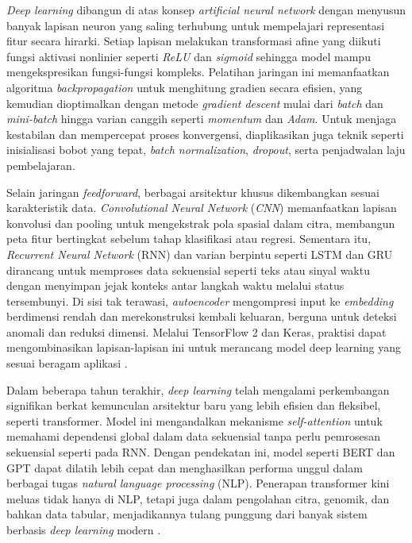 \emph{Deep learning} dibangun di atas konsep \emph{artificial neural network} dengan menyusun banyak lapisan neuron yang saling terhubung untuk mempelajari representasi fitur secara hirarki. Setiap lapisan melakukan transformasi afine yang diikuti fungsi aktivasi nonlinier seperti \emph{ReLU} dan \emph{sigmoid} sehingga model mampu mengekspresikan fungsi-fungsi kompleks. Pelatihan jaringan ini memanfaatkan algoritma \emph{backpropagation} untuk menghitung gradien secara efisien, yang kemudian dioptimalkan dengan metode \emph{gradient descent} mulai dari \emph{batch} dan \emph{mini-batch} hingga varian canggih seperti \emph{momentum} dan \emph{Adam}. Untuk menjaga kestabilan dan mempercepat proses konvergensi, diaplikasikan juga teknik seperti inisialisasi bobot yang tepat, \emph{batch normalization}, \emph{dropout}, serta penjadwalan laju pembelajaran.

Selain jaringan \emph{feedforward}, berbagai arsitektur khusus dikembangkan sesuai karakteristik data. \emph{Convolutional Neural Network} (\emph{CNN}) memanfaatkan lapisan konvolusi dan pooling untuk mengekstrak pola spasial dalam citra, membangun peta fitur bertingkat sebelum tahap klasifikasi atau regresi. Sementara itu, \emph{Recurrent Neural Network} (RNN) dan varian berpintu seperti LSTM dan GRU dirancang untuk memproses data sekuensial seperti teks atau sinyal waktu dengan menyimpan jejak konteks antar langkah waktu melalui status tersembunyi. Di sisi tak terawasi, \emph{autoencoder} mengompresi input ke \emph{embedding} berdimensi rendah dan merekonstruksi kembali keluaran, berguna untuk deteksi anomali dan reduksi dimensi. Melalui TensorFlow 2 dan Keras, praktisi dapat mengombinasikan lapisan-lapisan ini untuk merancang model deep learning yang sesuai beragam aplikasi \cite{Geron2019}.

Dalam beberapa tahun terakhir, \textit{deep learning} telah mengalami perkembangan signifikan berkat kemunculan arsitektur baru yang lebih efisien dan fleksibel, seperti transformer. Model ini mengandalkan mekanisme \textit{self-attention} untuk memahami dependensi global dalam data sekuensial tanpa perlu pemrosesan sekuensial seperti pada RNN. Dengan pendekatan ini, model seperti BERT dan GPT dapat dilatih lebih cepat dan menghasilkan performa unggul dalam berbagai tugas \textit{natural language processing} (NLP). Penerapan transformer kini meluas tidak hanya di NLP, tetapi juga dalam pengolahan citra, genomik, dan bahkan data tabular, menjadikannya tulang punggung dari banyak sistem berbasis \textit{deep learning} modern \cite{liu2021swin}.

